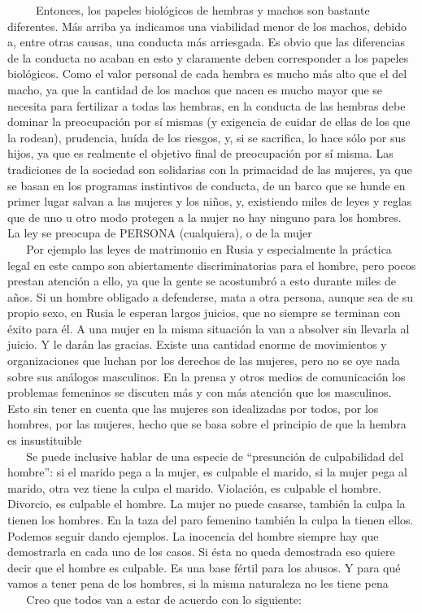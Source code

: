 ~ ~ ~ Entonces, los papeles biológicos de hembras y machos son bastante
diferentes. Más arriba ya indicamos una viabilidad menor de los machos,
debido a, entre otras causas, una conducta más arriesgada. Es obvio que
las diferencias de la conducta no acaban en esto y claramente deben
corresponder a los papeles biológicos. Como el valor personal de cada
hembra es mucho más alto que el del macho, ya que la cantidad de los
machos que nacen es mucho mayor que se necesita para fertilizar a todas
las hembras, en la conducta de las hembras debe dominar la preocupación
por sí mismas (y exigencia de cuidar de ellas de los que la rodean),
prudencia, huída de los riesgos, y, si se sacrifica, lo hace sólo por
sus hijos, ya que es realmente el objetivo final de preocupación por sí
misma. Las tradiciones de la sociedad son solidarias con la primacidad
de las mujeres, ya que se basan en los programas instintivos de
conducta, de un barco que se hunde en primer lugar salvan a las mujeres
y los niños, y, existiendo miles de leyes y reglas que de uno u otro
modo protegen a la mujer no hay ninguno para los hombres. La ley se
preocupa de PERSONA (cualquiera), o de la mujer\\
\hspace*{0.333em} ~ ~ Por ejemplo las leyes de matrimonio en Rusia y
especialmente la práctica legal en este campo son abiertamente
discriminatorias para el hombre, pero pocos prestan atención a ello, ya
que la gente se acostumbró a esto durante miles de años. Si un hombre
obligado a defenderse, mata a otra persona, aunque sea de su propio
sexo, en Rusia le esperan largos juicios, que no siempre se terminan con
éxito para él. A una mujer en la misma situación la van a absolver sin
llevarla al juicio. Y le darán las gracias. Existe una cantidad enorme
de movimientos y organizaciones que luchan por los derechos de las
mujeres, pero no se oye nada sobre sus análogos masculinos. En la prensa
y otros medios de comunicación los problemas femeninos se discuten más y
con más atención que los masculinos. Esto sin tener en cuenta que las
mujeres son idealizadas por todos, por los hombres, por las mujeres,
hecho que se basa sobre el principio de que la hembra es insustituible\\
\hspace*{0.333em} ~ ~ Se puede inclusive hablar de una especie de
``presunción de culpabilidad del hombre'': si el marido pega a la mujer,
es culpable el marido, si la mujer pega al marido, otra vez tiene la
culpa el marido. Violación, es culpable el hombre. Divorcio, es culpable
el hombre. La mujer no puede casarse, también la culpa la tienen los
hombres. En la taza del paro femenino también la culpa la tienen ellos.
Podemos seguir dando ejemplos. La inocencia del hombre siempre hay que
demostrarla en cada uno de los casos. Si ésta no queda demostrada eso
quiere decir que el hombre es culpable. Es una base fértil para los
abusos. Y para qué vamos a tener pena de los hombres, si la misma
naturaleza no les tiene pena\\
\hspace*{0.333em} ~ ~ Creo que todos van a estar de acuerdo con lo
siguiente:

